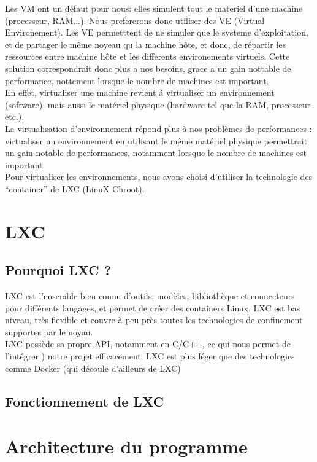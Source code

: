 \documentclass[a4paper]{article}
\begin{document}
Les VM ont un d\'efaut pour nous: elles simulent tout le materiel d'une machine (processeur, RAM...). Nous prefererons donc utiliser des VE (Virtual Environement). Les VE permetttent de ne simuler que le systeme d'exploitation, et de partager le m\^eme noyeau qu la machine h\^ote, et donc, de r\'epartir les ressources entre machine h\^ote et les differents environements virtuels. Cette solution correspondrait donc plus a nos besoins, grace a un gain nottable de performance, nottement lorsque le nombre de machines est important.\\

En effet, virtualiser une machine revient \'a virtualiser un environnement (software), mais aussi le mat\'eriel physique (hardware tel que la RAM, processeur etc.).\\La virtualisation d'environnement r\'epond plus \`a nos probl\`emes de performances :  virtualiser un environnement en utilisant le m\^eme mat\'eriel physique permettrait un gain notable de performances, notamment lorsque le nombre de machines est important. \\
Pour virtualiser les environnements, nous avons choisi d'utiliser la technologie des ``container'' de LXC (LinuX Chroot).

\section{LXC}
\subsection{Pourquoi LXC ?}
LXC est l'ensemble bien connu d'outils, modèles, bibliothèque et connecteurs pour diff\'erents langages, et permet de cr\'eer des containers Linux. LXC est bas niveau, très flexible et couvre à peu près toutes les technologies de confinement supportes par le noyau.\\LXC possède sa propre API, notamment en C/C++, ce qui nous permet de l'int\'egrer ) notre projet efficacement. LXC est plus l\'eger que des technologies comme Docker (qui d\'ecoule d'ailleurs de LXC)

\subsection{Fonctionnement de LXC}


\section{Architecture du programme}
\end{document}
